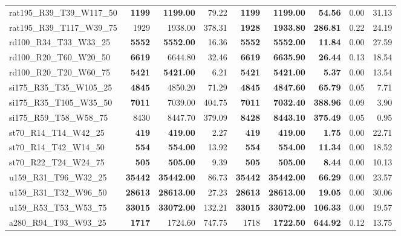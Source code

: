 \documentclass{singlecol-new}
\begin{document}
{\begin{longtable}{lrrrrrrrr}
		rat195\_R39\_T39\_W117\_50 & \textbf{1199} & \textbf{1199.00} & 79.22 & \textbf{1199} & \textbf{1199.00} & \textbf{54.56} & 0.00 & 31.13 \\
		rat195\_R39\_T117\_W39\_75 & 1929 & 1938.00 & 378.31 & \textbf{1928} & \textbf{1933.80} & \textbf{286.81} & 0.22 & 24.19 \\
		rd100\_R34\_T33\_W33\_25 & \textbf{5552} & \textbf{5552.00} & 16.36 & \textbf{5552} & \textbf{5552.00} & \textbf{11.84} & 0.00 & 27.59 \\
		rd100\_R20\_T60\_W20\_50 & \textbf{6619} & 6644.80 & 32.46 & \textbf{6619} & \textbf{6635.90} & \textbf{26.44} & 0.13 & 18.54 \\
		rd100\_R20\_T20\_W60\_75 & \textbf{5421} & \textbf{5421.00} & 6.21 & \textbf{5421} & \textbf{5421.00} & \textbf{5.37} & 0.00 & 13.54 \\
		si175\_R35\_T35\_W105\_25 & \textbf{4845} & 4850.20 & 71.29 & \textbf{4845} & \textbf{4847.60} & \textbf{65.79} & 0.05 & 7.71 \\
		si175\_R35\_T105\_W35\_50 & \textbf{7011} & 7039.00 & 404.75 & \textbf{7011} & \textbf{7032.40} & \textbf{388.96} & 0.09 & 3.90 \\
		si175\_R59\_T58\_W58\_75 & 8430 & 8447.70 & 379.09 & \textbf{8428} & \textbf{8443.10} & \textbf{375.49} & 0.05 & 0.95 \\
		st70\_R14\_T14\_W42\_25 & \textbf{419} & \textbf{419.00} & 2.27 & \textbf{419} & \textbf{419.00} & \textbf{1.75} & 0.00 & 22.71 \\
		st70\_R14\_T42\_W14\_50 & \textbf{554} & \textbf{554.00} & 13.92 & \textbf{554} & \textbf{554.00} & \textbf{11.34} & 0.00 & 18.52 \\
		st70\_R22\_T24\_W24\_75 & \textbf{505} & \textbf{505.00} & 9.39 & \textbf{505} & \textbf{505.00} & \textbf{8.44} & 0.00 & 10.13 \\
		u159\_R31\_T96\_W32\_25 & \textbf{35442} & \textbf{35442.00} & 86.73 & \textbf{35442} & \textbf{35442.00} & \textbf{66.29} & 0.00 & 23.57 \\
		u159\_R31\_T32\_W96\_50 & \textbf{28613} & \textbf{28613.00} & 27.23 & \textbf{28613} & \textbf{28613.00} & \textbf{19.05} & 0.00 & 30.06 \\
		u159\_R53\_T53\_W53\_75 & \textbf{33015} & \textbf{33072.00} & 132.21 & \textbf{33015} & \textbf{33072.00} & \textbf{106.33} & 0.00 & 19.57 \\
		a280\_R94\_T93\_W93\_25 & \textbf{1717} & 1724.60 & 747.75 & 1718 & \textbf{1722.50} & \textbf{644.92} & 0.12 & 13.75 \\

\end{longtable}}
\end{document}
